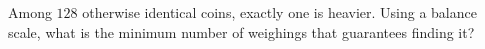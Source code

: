 Among $128$ otherwise identical coins, exactly one is heavier. Using a balance scale, what is the minimum number of weighings that guarantees finding it?
